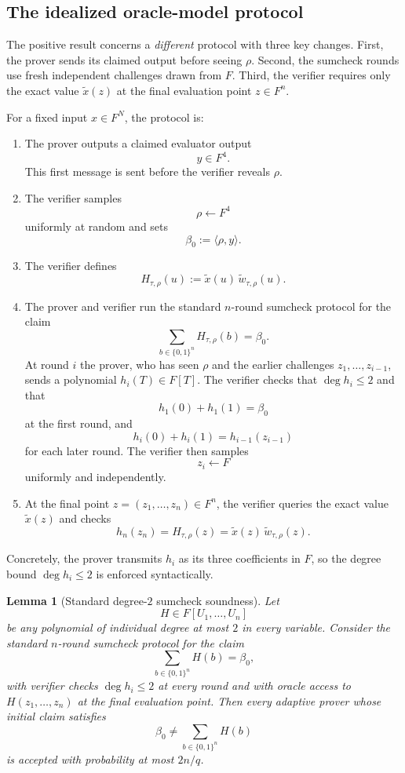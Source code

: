 \documentclass[11pt]{article}
\newtheorem{lemma}[theorem]{Lemma}
\begin{document}
\subsection{The idealized oracle-model protocol}

The positive result concerns a \emph{different} protocol with three key changes. First, the prover sends its claimed output before seeing $\rho$. Second, the sumcheck rounds use fresh independent challenges drawn from $F$. Third, the verifier requires only the exact value $\widetilde x(z)$ at the final evaluation point $z\in F^n$.

For a fixed input $x\in F^N$, the protocol is:
\begin{enumerate}[label=\arabic*.]
\item The prover outputs a claimed evaluator output
\[
y\in F^4.
\]
This first message is sent before the verifier reveals $\rho$.
\item The verifier samples
\[
\rho\leftarrow F^4
\]
uniformly at random and sets
\[
\beta_0:=\langle \rho,y\rangle.
\]
\item The verifier defines
\[
H_{\tau,\rho}(u):=\widetilde x(u)\,\widetilde w_{\tau,\rho}(u).
\]
\item The prover and verifier run the standard $n$-round sumcheck protocol for the claim
\[
\sum_{b\in\{0,1\}^n} H_{\tau,\rho}(b)=\beta_0.
\]
At round $i$ the prover, who has seen $\rho$ and the earlier challenges $z_1,\dots,z_{i-1}$, sends a polynomial $h_i(T)\in F[T]$. The verifier checks that $\deg h_i\le 2$ and that
\[
h_1(0)+h_1(1)=\beta_0
\]
at the first round, and
\[
h_i(0)+h_i(1)=h_{i-1}(z_{i-1})
\]
for each later round. The verifier then samples
\[
z_i\leftarrow F
\]
uniformly and independently.
\item At the final point $z=(z_1,\dots,z_n)\in F^n$, the verifier queries the exact value $\widetilde x(z)$ and checks
\[
h_n(z_n)=H_{\tau,\rho}(z)=\widetilde x(z)\,\widetilde w_{\tau,\rho}(z).
\]
\end{enumerate}
Concretely, the prover transmits $h_i$ as its three coefficients in $F$, so the degree bound $\deg h_i\le 2$ is enforced syntactically.

\begin{lemma}[Standard degree-$2$ sumcheck soundness]
\label{lem:it-sumcheck}
Let
\[
H\in F[U_1,\dots,U_n]
\]
be any polynomial of individual degree at most $2$ in every variable. Consider the standard $n$-round sumcheck protocol for the claim
\[
\sum_{b\in\{0,1\}^n} H(b)=\beta_0,
\]
with verifier checks $\deg h_i\le 2$ at every round and with oracle access to $H(z_1,\dots,z_n)$ at the final evaluation point. Then every adaptive prover whose initial claim satisfies
\[
\beta_0\neq\sum_{b\in\{0,1\}^n} H(b)
\]
is accepted with probability at most $2n/q$.
\end{lemma}
\end{document}
